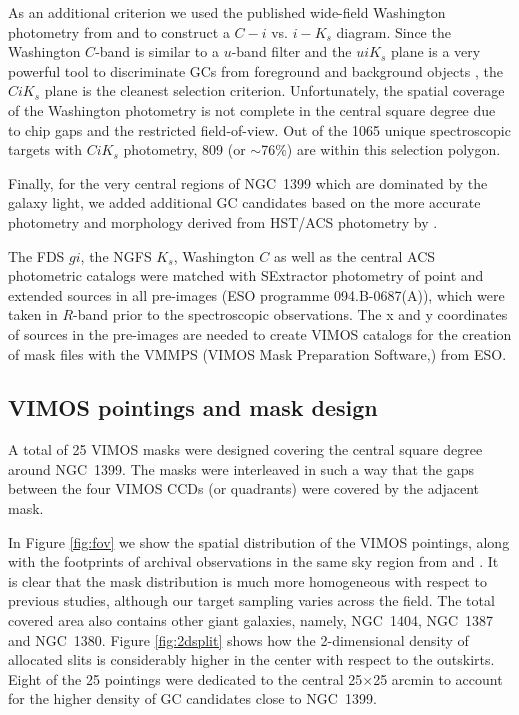 \documentclass[useAMS,usenatbib]{mn2e}
\begin{document}
As an additional criterion we used the published wide-field Washington 
photometry from \citet{Dirsch04} and \citet{Bassino} to construct a $C-i$ vs. 
$i-K_s$ diagram. Since the Washington $C$-band is similar to a $u$-band filter 
and the $uiK_s$ plane is a very powerful tool to discriminate GCs from 
foreground and background objects \citep{Munoz14}, the $CiK_s$ plane is the 
cleanest selection criterion. Unfortunately, the spatial coverage of the 
Washington photometry is not complete in the central square degree due to chip 
gaps and the restricted field-of-view. 
Out of the 1065 unique spectroscopic targets with $CiK_s$ photometry, 809 (or 
$\sim$76\%) are within this selection polygon.

Finally, for the very central regions of NGC~1399 which are dominated by the 
galaxy light, we added additional GC candidates based on the more accurate 
photometry and morphology derived from HST/ACS photometry by \citet{Puzia14}.

The FDS $gi$, the NGFS $K_s$, Washington $C$ as well as the central ACS  
photometric catalogs were matched with SExtractor photometry of point and 
extended sources in all pre-images (ESO programme 094.B-0687(A)), which were 
taken in $R$-band prior to the spectroscopic observations. The x and y 
coordinates of sources in the pre-images are needed to create VIMOS catalogs 
for the creation of mask files with the VMMPS (VIMOS Mask Preparation 
Software,\citealt{Bottini05}) from ESO.

\subsection{VIMOS pointings and mask design}
\label{sec:VIMOSpointings}

A total of 25 VIMOS masks were designed covering the central square degree 
around NGC~1399. The masks were interleaved in such a way that the gaps between 
the four VIMOS CCDs (or quadrants) were covered by the adjacent mask. 

In Figure \ref{fig:fov} we show the spatial distribution of the VIMOS 
pointings, along with the footprints of archival observations in the same sky 
region from \citet{Schuberth} and \citet{Bergond07}. It is clear that the mask 
distribution is much more homogeneous with respect to previous studies, 
although our target sampling varies across the field. The total covered area 
also contains other giant galaxies, namely, NGC~1404, NGC~1387 and NGC~1380.  
Figure \ref{fig:2dsplit} shows how the 2-dimensional density of allocated slits 
is considerably higher in the center with respect to the outskirts. Eight of 
the 25 pointings were dedicated to the central 25$\times$25 arcmin to account 
for the higher density of GC candidates close to NGC~1399. 
\end{document}

